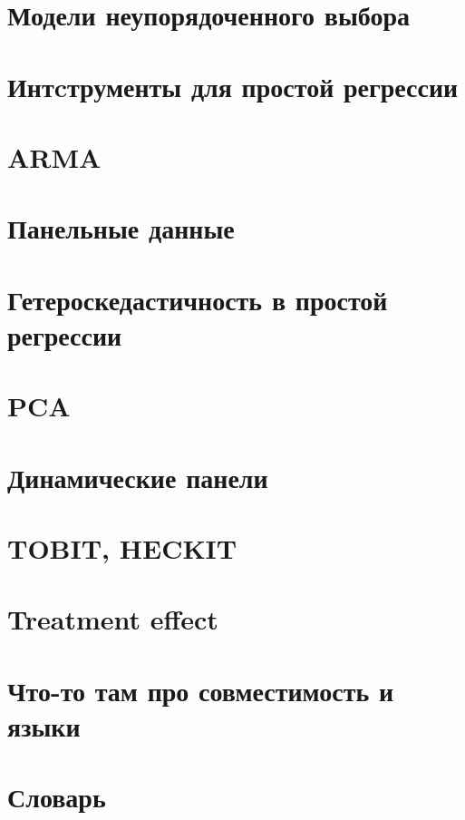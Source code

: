 \documentclass[]{book}
\begin{document}
\hypertarget{disordered}{%
\chapter{Модели неупорядоченного выбора}\label{disordered}}

\hypertarget{instruments}{%
\chapter{Интcтрументы для простой регрессии}\label{instruments}}

\hypertarget{arma}{%
\chapter{ARMA}\label{arma}}

\hypertarget{paneldata}{%
\chapter{Панельные данные}\label{paneldata}}

\hypertarget{heterosked}{%
\chapter{Гетероскедастичность в простой регрессии}\label{heterosked}}

\hypertarget{pca}{%
\chapter{PCA}\label{pca}}

\hypertarget{dinpanel}{%
\chapter{Динамические панели}\label{dinpanel}}

\hypertarget{tobit_heckit}{%
\chapter{TOBIT, HECKIT}\label{tobit_heckit}}

\hypertarget{treatment}{%
\chapter{Treatment effect}\label{treatment}}

\hypertarget{compatability}{%
\chapter{Что-то там про совместимость и языки}\label{compatability}}

\hypertarget{dict}{%
\chapter{Словарь}\label{dict}}


\end{document}
